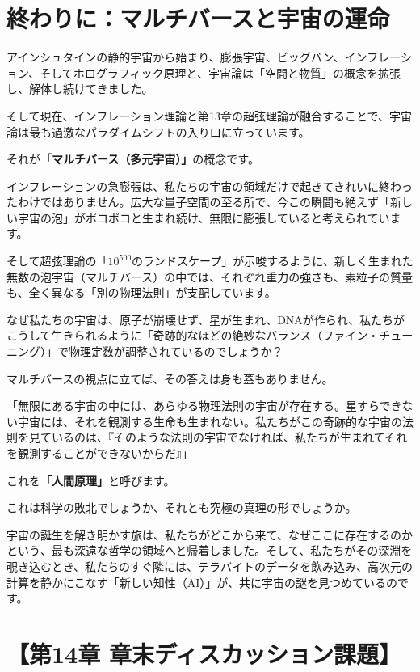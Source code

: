 \section{終わりに：マルチバースと宇宙の運命}

アインシュタインの静的宇宙から始まり、膨張宇宙、ビッグバン、インフレーション、そしてホログラフィック原理と、宇宙論は「空間と物質」の概念を拡張し、解体し続けてきました。

そして現在、インフレーション理論と第13章の超弦理論が融合することで、宇宙論は最も過激なパラダイムシフトの入り口に立っています。

それが\textbf{「マルチバース（多元宇宙）」}の概念です。

インフレーションの急膨張は、私たちの宇宙の領域だけで起きてきれいに終わったわけではありません。広大な量子空間の至る所で、今この瞬間も絶えず「新しい宇宙の泡」がポコポコと生まれ続け、無限に膨張していると考えられています。

そして超弦理論の「\(10^{500}\)のランドスケープ」が示唆するように、新しく生まれた無数の泡宇宙（マルチバース）の中では、それぞれ重力の強さも、素粒子の質量も、全く異なる「別の物理法則」が支配しています。

なぜ私たちの宇宙は、原子が崩壊せず、星が生まれ、DNAが作られ、私たちがこうして生きられるように「奇跡的なほどの絶妙なバランス（ファイン・チューニング）」で物理定数が調整されているのでしょうか？

マルチバースの視点に立てば、その答えは身も蓋もありません。

「無限にある宇宙の中には、あらゆる物理法則の宇宙が存在する。星すらできない宇宙には、それを観測する生命も生まれない。私たちがこの奇跡的な宇宙の法則を見ているのは、『そのような法則の宇宙でなければ、私たちが生まれてそれを観測することができないからだ』」

これを\textbf{「人間原理」}と呼びます。

これは科学の敗北でしょうか、それとも究極の真理の形でしょうか。

宇宙の誕生を解き明かす旅は、私たちがどこから来て、なぜここに存在するのかという、最も深遠な哲学の領域へと帰着しました。そして、私たちがその深淵を覗き込むとき、私たちのすぐ隣には、テラバイトのデータを飲み込み、高次元の計算を静かにこなす「新しい知性（AI）」が、共に宇宙の謎を見つめているのです。

\section*{【第14章 章末ディスカッション課題】}

